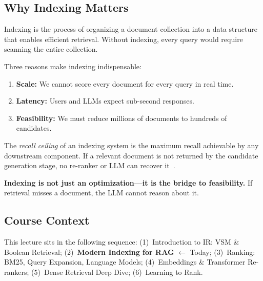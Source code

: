 \documentclass[11pt,a4paper]{article}
\theoremstyle{definition}
\theoremstyle{plain}
\begin{document}
\subsection{Why Indexing Matters}

Indexing is the process of organizing a document collection into a data structure that enables efficient retrieval. Without indexing, every query would require scanning the entire collection.

\begin{center}

\end{center}

Three reasons make indexing indispensable:
\begin{enumerate}
    \item \textbf{Scale:} We cannot score every document for every query in real time.
    \item \textbf{Latency:} Users and LLMs expect sub-second responses.
    \item \textbf{Feasibility:} We must reduce millions of documents to hundreds of candidates.
\end{enumerate}

The \emph{recall ceiling} of an indexing system is the maximum recall achievable by any downstream component. If a relevant document is not returned by the candidate generation stage, no re-ranker or LLM can recover it~\cite{robertson2009probabilistic}.

\begin{center}

\end{center}

\begin{keytakeaway}
\textbf{Indexing is not just an optimization---it is the bridge to feasibility.} If retrieval misses a document, the LLM cannot reason about it.
\end{keytakeaway}

\subsection{Course Context}

This lecture sits in the following sequence: (1)~Introduction to IR: VSM \& Boolean Retrieval; (2)~\textbf{Modern Indexing for RAG} $\leftarrow$ Today; (3)~Ranking: BM25, Query Expansion, Language Models; (4)~Embeddings \& Transformer Re-rankers; (5)~Dense Retrieval Deep Dive; (6)~Learning to Rank.

\end{document}
